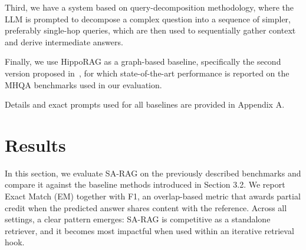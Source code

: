 \documentclass{article}
\begin{document}
Third, we have a system based on query-decomposition methodology, where the LLM is prompted to decompose a complex question into a sequence of simpler, preferably single-hop queries, which are then used to sequentially gather context and derive intermediate answers.

Finally, we use HippoRAG as a graph-based baseline, specifically the second version proposed in~\cite{gutierrez2025rag}, for which state-of-the-art performance is reported on the MHQA benchmarks used in our evaluation.

Details and exact prompts used for all baselines are provided in Appendix A.

\section{Results}
In this section, we evaluate SA-RAG on the previously described benchmarks and compare it against the baseline methods introduced in Section 3.2. We report Exact Match (EM) together with F1, an overlap-based metric that awards partial credit when the predicted answer shares content with the reference. Across all settings, a clear pattern emerges: SA-RAG is competitive as a standalone retriever, and it becomes most impactful when used within an iterative retrieval hook.
\end{document}

